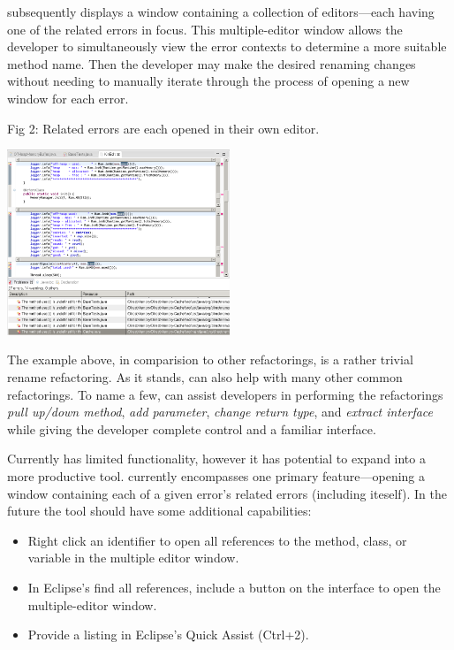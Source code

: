 \documentclass{sigplanconf}
\begin{document}
\pname{} subsequently displays a window containing a collection of
editors---each having
one of the related errors in focus. This multiple-editor window allows the
developer to simultaneously view the error
contexts to determine a more suitable method name. Then the developer may make
the desired renaming changes without needing to manually iterate through the
process of opening a new window for each error.
\begin{center}
\caption*{Fig 2: Related errors are each opened in their own editor.}
\includegraphics[width=0.50\textwidth]{multiple-editors.png}
\end{center}

The example above, in comparision to other refactorings,  is a rather trivial
rename refactoring. As it stands,
\pname{} can also help with many other common refactorings.
To name a few, \pname{} can assist developers in performing the refactorings
\textit{pull up/down method}, \textit{add parameter},
\textit{change return type}, and \textit{extract interface}
while giving the developer complete control and a familiar interface.

Currently \pname{} has limited functionality, however it has potential to expand
into a more productive tool. \pname{} currently encompasses one primary
feature---opening a window containing each of a given error's related errors
(including iteself). In the future the tool should have some additional
capabilities:

\begin{itemize}
  \item Right click an identifier to open all references to the method, class,
      or variable in the multiple editor window.
  \item In Eclipse's find all references, include a button on the interface
      to open the multiple-editor window.
  \item Provide a listing in Eclipse's Quick Assist (Ctrl+2).
\end{itemize}
\end{document}
